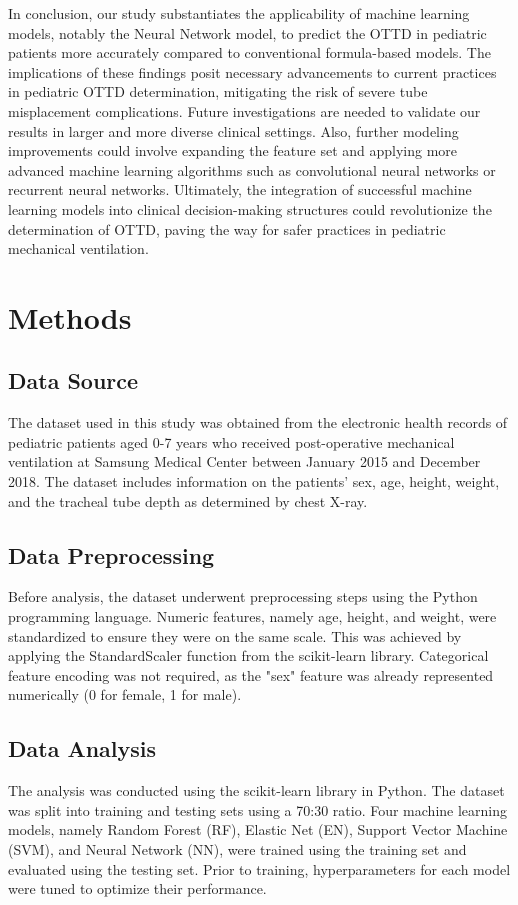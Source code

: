 \documentclass[11pt]{article}
\begin{document}
In conclusion, our study substantiates the applicability of machine learning models, notably the Neural Network model, to predict the OTTD in pediatric patients more accurately compared to conventional formula-based models. The implications of these findings posit necessary advancements to current practices in pediatric OTTD determination, mitigating the risk of severe tube misplacement complications. Future investigations are needed to validate our results in larger and more diverse clinical settings. Also, further modeling improvements could involve expanding the feature set and applying more advanced machine learning algorithms such as convolutional neural networks or recurrent neural networks. Ultimately, the integration of successful machine learning models into clinical decision-making structures could revolutionize the determination of OTTD, paving the way for safer practices in pediatric mechanical ventilation.

\section*{Methods}

\subsection*{Data Source}
The dataset used in this study was obtained from the electronic health records of pediatric patients aged 0-7 years who received post-operative mechanical ventilation at Samsung Medical Center between January 2015 and December 2018. The dataset includes information on the patients' sex, age, height, weight, and the tracheal tube depth as determined by chest X-ray.

\subsection*{Data Preprocessing}
Before analysis, the dataset underwent preprocessing steps using the Python programming language. Numeric features, namely age, height, and weight, were standardized to ensure they were on the same scale. This was achieved by applying the StandardScaler function from the scikit-learn library. Categorical feature encoding was not required, as the "sex" feature was already represented numerically (0 for female, 1 for male).

\subsection*{Data Analysis}
The analysis was conducted using the scikit-learn library in Python. The dataset was split into training and testing sets using a 70:30 ratio. Four machine learning models, namely Random Forest (RF), Elastic Net (EN), Support Vector Machine (SVM), and Neural Network (NN), were trained using the training set and evaluated using the testing set. Prior to training, hyperparameters for each model were tuned to optimize their performance.
\end{document}
